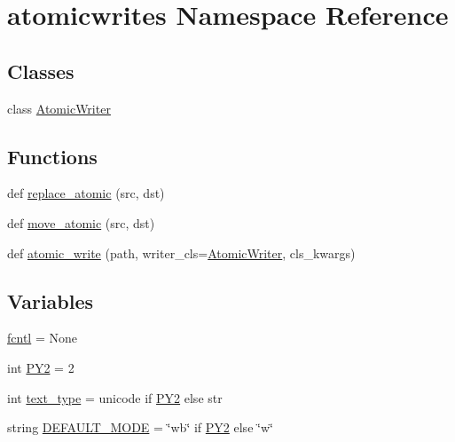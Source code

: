 \hypertarget{namespaceatomicwrites}{}\section{atomicwrites Namespace Reference}
\label{namespaceatomicwrites}
\subsection*{Classes}
\begin{DoxyCompactItemize}
\item 
class \hyperlink{classatomicwrites_1_1_atomic_writer}{Atomic\+Writer}
\end{DoxyCompactItemize}
\subsection*{Functions}
\begin{DoxyCompactItemize}
\item 
def \hyperlink{namespaceatomicwrites_a0b838ddf6d04138974560f54882d1d7c}{replace\+\_\+atomic} (src, dst)
\item 
def \hyperlink{namespaceatomicwrites_a9119d986230aa83ba3faf3b0f1dd7824}{move\+\_\+atomic} (src, dst)
\item 
def \hyperlink{namespaceatomicwrites_a019d5cceda829d130599a1c7343e2000}{atomic\+\_\+write} (path, writer\+\_\+cls=\hyperlink{classatomicwrites_1_1_atomic_writer}{Atomic\+Writer}, cls\+\_\+kwargs)
\end{DoxyCompactItemize}
\subsection*{Variables}
\begin{DoxyCompactItemize}
\item 
\hyperlink{namespaceatomicwrites_a052cf96beb5954d5923ab338842ebc23}{fcntl} = None
\item 
int \hyperlink{namespaceatomicwrites_a142f5f24b1f83a61fca862b2b4f1202c}{P\+Y2} = 2
\item 
int \hyperlink{namespaceatomicwrites_ab0acf4cf3a419dc7a6a3c22e32019a1c}{text\+\_\+type} = unicode if \hyperlink{namespaceatomicwrites_a142f5f24b1f83a61fca862b2b4f1202c}{P\+Y2} else str
\item 
string \hyperlink{namespaceatomicwrites_a1df24b2608e442584eb44060eeb599ad}{D\+E\+F\+A\+U\+L\+T\+\_\+\+M\+O\+DE} = \char`\"{}wb\char`\"{} if \hyperlink{namespaceatomicwrites_a142f5f24b1f83a61fca862b2b4f1202c}{P\+Y2} else \char`\"{}w\char`\"{}
\end{DoxyCompactItemize}


